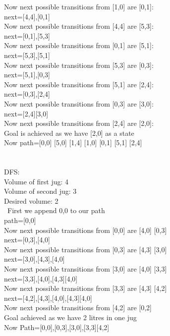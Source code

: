 \documentclass[conference]{IEEEtran}
\begin{document}
Now next possible transitions from [1,0] are [0,1]:\\
next={[4,4],[0,1]}\\
Now next possible transitions from [4,4] are [5,3]:\\
next={[0,1],[5,3]}\\
Now next possible transitions from [0,1] are [5,1]:\\
next={[5,3],[5,1]}\\
Now next possible transitions from [5,3] are [0,3]:\\
next={[5,1],[0,3]}\\
Now next possible transitions from [5,1] are [2,4]:\\
next={[0,3],[2,4]}\\
Now next possible transitions from [0,3] are [3,0]:\\
next={[2,4][3,0]}\\
Now next possible transitions from [2,4] are [2,0]:\\
Goal is achieved as we have [2,0] as a state\\
Now path=[0,0] [5,0] [1,4] [1,0] [0,1] [5,1] [2,4]\\\\
\\
DFS:\\
Volume of first jug: 4\\
Volume of second jug: 3\\
Desired volume: 2\\\
First we append {0,0} to our path\\
path={[0,0]}\\
Now next possible transitions from [0,0] are [4,0] [0,3]\\
next={[0,3],[4,0]}\\
Now next possible transitions from [0,3] are [4,3] [3,0]\\
next={[3,0],[4,3],[4,0]}\\
Now next possible transitions from [3,0] are [4,0] [3,3]\\
next={[3,3],[4,0],[4,3][4,0]}\\
Now next possible transitions from [3,3] are [4,3] [4,2]\\
next={[4,2],[4,3],[4,0],[4,3][4,0]}\\
Now next possible transitions from [4,2] are [0,2]\\
Goal achieved as we have 2 litres in one jug\\
Now Path={[0,0],[0,3],[3,0],[3,3][4,2]}\\
\end{document}
